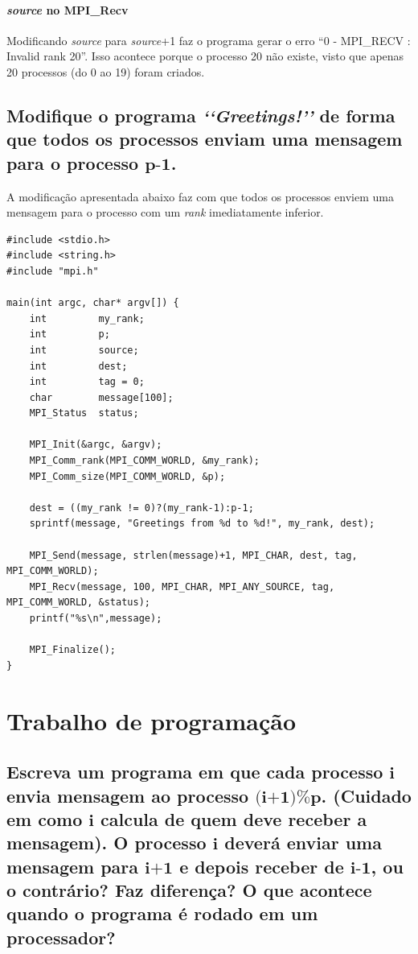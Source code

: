 \documentclass[11pt,a4paper,onecolumn]{article}
\begin{document}
\paragraph{\textit{source} no MPI\_Recv} Modificando \textit{source} para \textit{source}+1 faz o programa gerar o erro “0 - MPI\_RECV : Invalid rank 20”. Isso acontece porque o processo 20 não existe, visto que apenas 20 processos (do 0 ao 19) foram criados.

\subsection{Modifique o programa \textit{\lq\lq{}Greetings!\rq\rq{}} de forma que todos os processos enviam uma mensagem para o processo $\textbf{p-1}$.}
A modificação apresentada abaixo faz com que todos os processos enviem uma mensagem para o processo com um \textit{rank} imediatamente inferior.

\begin{lstlisting}[style=cc]
#include <stdio.h>
#include <string.h>
#include "mpi.h"

main(int argc, char* argv[]) {
    int         my_rank;
    int         p;
    int         source; 
    int         dest;
    int         tag = 0;   
    char        message[100]; 
    MPI_Status  status; 

    MPI_Init(&argc, &argv);
    MPI_Comm_rank(MPI_COMM_WORLD, &my_rank);
    MPI_Comm_size(MPI_COMM_WORLD, &p);

    dest = ((my_rank != 0)?(my_rank-1):p-1;
    sprintf(message, "Greetings from %d to %d!", my_rank, dest);

    MPI_Send(message, strlen(message)+1, MPI_CHAR, dest, tag, MPI_COMM_WORLD);
    MPI_Recv(message, 100, MPI_CHAR, MPI_ANY_SOURCE, tag, MPI_COMM_WORLD, &status);
    printf("%s\n",message);

    MPI_Finalize();
} 
\end{lstlisting}

\section{Trabalho de programação}
\subsection{Escreva um programa em que cada processo $\textbf{i}$ envia mensagem ao processo $\textbf{(i+1)\%p}$. (Cuidado em como $\textbf{i}$ calcula de quem deve receber a mensagem). O processo $\textbf{i}$ deverá enviar uma mensagem para $\textbf{i+1}$ e depois receber de $\textbf{i-1}$, ou o contrário? Faz diferença? O que acontece quando o programa é rodado em um processador?}
\end{document}
